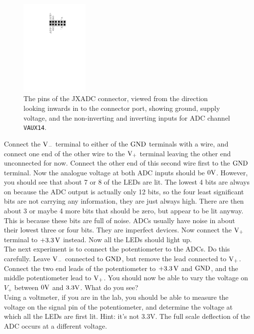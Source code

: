 \documentclass[../physical_computing.tex]{subfiles}
\begin{document}
\begin{figure}[htbp]
    \centering
    \includegraphics[width=0.3\textwidth]{figures/jxadc.pdf}
    \caption{The pins of the JXADC connector, viewed from the direction looking inwards in to the connector port, showing ground, supply voltage, and the non-inverting and inverting inputs for ADC channel \texttt{VAUX14}.}
    \label{fig:jxadc}
\end{figure}

Connect the $\rm V_-$ terminal to either of the $\rm GND$ terminals with a wire, and connect one end of the other wire to the $\rm V_+$ terminal leaving the other end unconnected for now. Connect the other end of this second wire first to the $\rm GND$ terminal. Now the analogue voltage at both ADC inputs should be $\rm 0V$. However, you should see that about 7 or 8 of the LEDs are lit. The lowest 4 bits are always on because the ADC output is actually only 12 bits, so the four least significant bits are not carrying any information, they are just always high. There are then about 3 or maybe 4 more bits that should be zero, but appear to be lit anyway. This is because these bits are full of noise. ADCs usually have noise in about their lowest three or four bits. They are imperfect devices. Now connect the $\rm V_+$ terminal to $\rm +3.3\,V$ instead. Now all the LEDs should light up. \\

The next experiment is to connect the potentiometer to the ADCs. Do this carefully. Leave $\rm V_-$ connected to $\rm GND$, but remove the lead connected to $\rm V_+$. Connect the two end leads of the potentiometer to $\rm +3.3\,V$ and $\rm GND$, and the middle potentiometer lead to $\rm V_+$. You should now be able to vary the voltage on $V_+$ between $\rm 0V$ and $\rm 3.3V$. What do you see? \\

Using a voltmeter, if you are in the lab, you should be able to measure the voltage on the signal pin of the potentiometer, and determine the voltage at which all the LEDs are first lit. Hint: it's not 3.3V. The full scale deflection of the ADC occurs at a different voltage. \\
\end{document}
